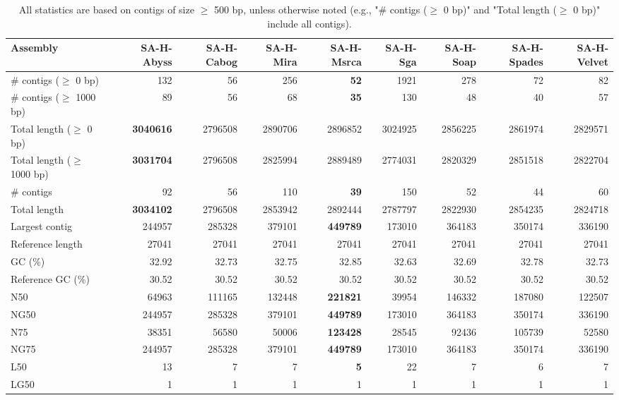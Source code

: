 \documentclass[12pt,a4paper]{article}
\begin{document}
\begin{table}[ht]
\begin{center}
\caption{All statistics are based on contigs of size $\geq$ 500 bp, unless otherwise noted (e.g., "\# contigs ($\geq$ 0 bp)" and "Total length ($\geq$ 0 bp)" include all contigs).}
\begin{tabular}{|l*{8}{|r}|}
\hline
Assembly & SA-H-Abyss & SA-H-Cabog & SA-H-Mira & SA-H-Msrca & SA-H-Sga & SA-H-Soap & SA-H-Spades & SA-H-Velvet \\ \hline
\# contigs ($\geq$ 0 bp) & 132 & 56 & 256 & {\bf 52} & 1921 & 278 & 72 & 82 \\ \hline
\# contigs ($\geq$ 1000 bp) & 89 & 56 & 68 & {\bf 35} & 130 & 48 & 40 & 57 \\ \hline
Total length ($\geq$ 0 bp) & {\bf 3040616} & 2796508 & 2890706 & 2896852 & 3024925 & 2856225 & 2861974 & 2829571 \\ \hline
Total length ($\geq$ 1000 bp) & {\bf 3031704} & 2796508 & 2825994 & 2889489 & 2774031 & 2820329 & 2851518 & 2822704 \\ \hline
\# contigs & 92 & 56 & 110 & {\bf 39} & 150 & 52 & 44 & 60 \\ \hline
Total length & {\bf 3034102} & 2796508 & 2853942 & 2892444 & 2787797 & 2822930 & 2854235 & 2824718 \\ \hline
Largest contig & 244957 & 285328 & 379101 & {\bf 449789} & 173010 & 364183 & 350174 & 336190 \\ \hline
Reference length & 27041 & 27041 & 27041 & 27041 & 27041 & 27041 & 27041 & 27041 \\ \hline
GC (\%) & 32.92 & 32.73 & 32.75 & 32.85 & 32.63 & 32.69 & 32.78 & 32.73 \\ \hline
Reference GC (\%) & 30.52 & 30.52 & 30.52 & 30.52 & 30.52 & 30.52 & 30.52 & 30.52 \\ \hline
N50 & 64963 & 111165 & 132448 & {\bf 221821} & 39954 & 146332 & 187080 & 122507 \\ \hline
NG50 & 244957 & 285328 & 379101 & {\bf 449789} & 173010 & 364183 & 350174 & 336190 \\ \hline
N75 & 38351 & 56580 & 50006 & {\bf 123428} & 28545 & 92436 & 105739 & 52580 \\ \hline
NG75 & 244957 & 285328 & 379101 & {\bf 449789} & 173010 & 364183 & 350174 & 336190 \\ \hline
L50 & 13 & 7 & 7 & {\bf 5} & 22 & 7 & 6 & 7 \\ \hline
LG50 & 1 & 1 & 1 & 1 & 1 & 1 & 1 & 1 \\ \hline

\end{tabular}
\end{center}
\end{table}
\end{document}
